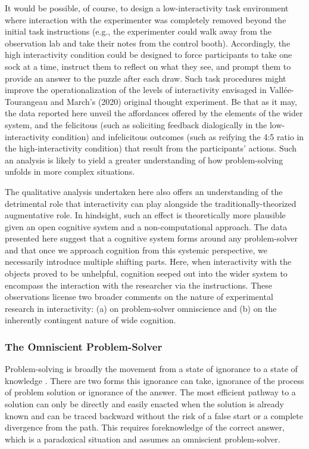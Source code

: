 \documentclass{article}
\begin{document}
It would be possible, of course, to design a low-interactivity task environment where interaction with the experimenter was completely removed beyond the initial task instructions (e.g., the experimenter could walk away from the observation lab and take their notes from the control booth). Accordingly, the high interactivity condition could be designed to force participants to take one sock at a time, instruct them to reflect on what they see, and prompt them to provide an answer to the puzzle after each draw. Such task procedures might improve the operationalization of the levels of interactivity envisaged in Vallée-Tourangeau and March's (2020) original thought experiment. Be that as it may, the data reported here unveil the affordances offered by the elements of the wider system, and the felicitous (such as soliciting feedback dialogically in the low-interactivity condition) and infelicitous outcomes (such as reifying the 4:5 ratio in the high-interactivity condition) that result from the participants' actions. Such an analysis is likely to yield a greater understanding of how problem-solving unfolds in more complex situations. 

The qualitative analysis undertaken here also offers an understanding of the detrimental role that interactivity can play alongside the traditionally-theorized augmentative role. In hindsight, such an effect is theoretically more plausible given an open cognitive system and a non-computational approach. The data presented here suggest that a cognitive system forms around any problem-solver and that once we approach cognition from this systemic perspective, we necessarily introduce multiple shifting parts. Here, when interactivity with the objects proved to be unhelpful, cognition seeped out into the wider system to encompass the interaction with the researcher via the instructions. These observations license two broader comments on the nature of experimental research in interactivity: (a) on problem-solver omniscience and (b) on the inherently contingent nature of wide cognition.

\subsubsection{The Omniscient Problem-Solver}

Problem-solving is broadly the movement from a state of ignorance to a state of knowledge \parencite{Arfini2019}. There are two forms this ignorance can take, ignorance of the process of problem solution or ignorance of the answer. The most efficient pathway to a solution can only be directly and easily enacted when the solution is already known and can be traced backward without the risk of a false start or a complete divergence from the path. This requires foreknowledge of the correct answer, which is a paradoxical situation and assumes an omniscient problem-solver.
\end{document}
